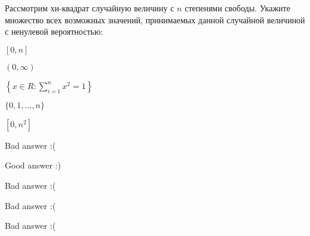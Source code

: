 
\begin{question}
Рассмотрим хи-квадрат случайную величину с \(n\) степенями свободы.
Укажите множество всех возможных значений, принимаемых данной случайной
величиной с ненулевой вероятностью:
\begin{answerlist}
  \item \([0,n]\)
  \item \((0,\infty )\)
  \item \(\left\{x\in R:\sum\limits_{i=1}^{n}{x_{{}}^{2}}=1\right\}\)
  \item \(\{0,1,\ldots,n\}\)
  \item \([0,n^2]\)
\end{answerlist}
\end{question}

\begin{solution}
\begin{answerlist}
  \item Bad answer :(
  \item Good answer :)
  \item Bad answer :(
  \item Bad answer :(
  \item Bad answer :(
\end{answerlist}
\end{solution}

